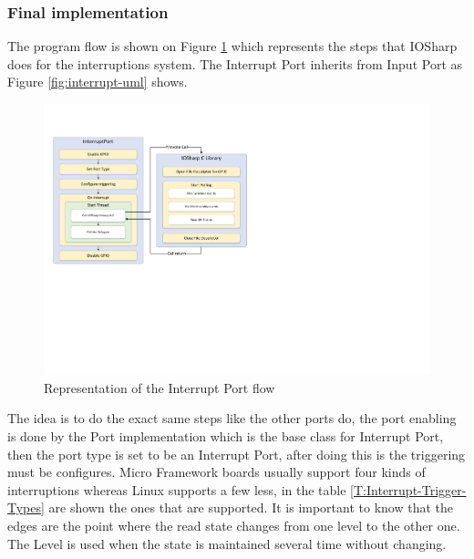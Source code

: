 \subsubsection{Final implementation}\label{SSS:IOSharp-Interrupt-Implementation}
The program flow is shown on Figure \ref{fig:interrupt-schema} which represents the steps that IOSharp does for the interruptions system. The Interrupt Port inherits from Input Port as Figure \ref{fig:interrupt-uml} shows.
\begin{figure}[H]\begin{center}
 \centering
  \captionsetup{justification=centering}
  \includegraphics[width=1\textwidth]{pictures/iosharp/interrupt-schema}
  \caption{Representation of the Interrupt Port flow \label{fig:interrupt-schema}}
\end{center}\end{figure}
The idea is to do the exact same steps like the other ports do, the port enabling is done by the Port implementation which is the base class for Interrupt Port, then the port type is set to be an Interrupt Port, after doing this is the triggering must be configures. Micro Framework boards usually support four kinds of interruptions whereas Linux supports a few less, in the table \ref{T:Interrupt-Trigger-Types} are shown the ones that are supported. It is important to know that the edges are the point where the read state changes from one level to the other one. The Level is used when the state is maintained several time without changing.


